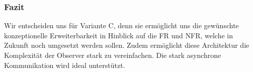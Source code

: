 \subsubsection{Fazit}
Wir entscheiden uns für Variante C, denn sie ermöglicht uns die gewünschte konzeptionelle Erweiterbarkeit in Hinblick auf die \ac{FR} und \ac{NFR}, welche in Zukunft noch umgesetzt werden sollen. Zudem ermöglicht diese Architektur die Komplexität der Observer stark zu vereinfachen. Die stark asynchrone Kommunikation wird ideal unterstützt.